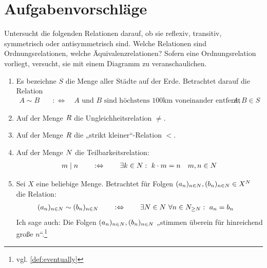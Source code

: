 \clearpage
\section{Aufgabenvorschläge}


\begin{aufg} \label{aufg:relationen}
    Untersucht die folgenden Relationen darauf, ob sie reflexiv, transitiv, symmetrisch oder antisymmetrisch sind. Welche Relationen sind Ordnungsrelationen, welche Äquivalenzrelationen? Sofern eine Ordnungsrelation vorliegt, versucht, sie mit einem Diagramm zu veranschaulichen.
    \begin{enumerate}
        \item Es bezeichne $S$ die Menge aller Städte auf der Erde. Betrachtet darauf die Relation
        \begin{align*}
            A \sim B \quad& :\Leftrightarrow\quad \text{$A$ und $B$ sind höchstens 100km voneinander entfernt} && A,B\in S
        \end{align*}
        \item Auf der Menge $\relax R$ die Ungleichheitsrelation $\neq$.
        \item Auf der Menge $\relax R$ die „strikt kleiner“-Relation $<$.
        \item Auf der Menge $\relax N$ die Teilbarkeitsrelation:
        \begin{align*}
            m\mid n \qquad:\Leftrightarrow\qquad \exists k\in \N:\ k\cdot m=n && m,n\in \N
        \end{align*}
        \item Sei $X$ eine beliebige Menge. Betrachtet für Folgen $(a_n)_{n\in \relax N},(b_n)_{n\in \relax N} \in X^\relax N$ die Relation:
        \begin{align*}
            (a_n)_{n\in \N} \sim (b_n)_{n\in \N} \qquad & :\Leftrightarrow\qquad \exists N\in \N\ \forall n\in \N_{\ge N}:\ a_n=b_n
        \end{align*}
            Ich sage auch: Die Folgen $(a_n)_{n\in \relax N},(b_n)_{n\in \relax N}$ „stimmen überein für hinreichend große $n$“.\footnote{vgl. \cref{def:eventually}}
    \end{enumerate}
\end{aufg}


